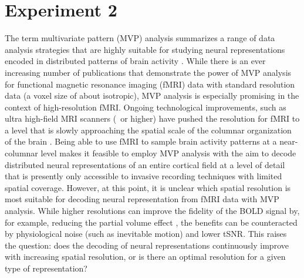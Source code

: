 
\chapter{Experiment 2}
The term multivariate pattern (MVP) analysis summarizes a range of data
analysis strategies that are highly suitable for studying neural
representations encoded in distributed patterns of brain activity
\citep{haxby_2012}. While there is an ever increasing number of publications
that demonstrate the power of MVP analysis for functional magnetic resonance
imaging (fMRI) data \citep{opdebeeck_2010,freeman_2011,alink_2013,freeman_2013}
with standard resolution data (a voxel size of about  isotropic), MVP
analysis is especially promising in the context of high-resolution fMRI.
Ongoing technological improvements, such as ultra high-field MRI scanners
(\sevenT\ or higher) have pushed the resolution for fMRI to a level
that is slowly approaching the spatial scale of the columnar organization of
the brain \citep{yacoub_2008,heidemann_2012}. Being able to use fMRI to sample
brain activity patterns at a near-columnar level makes it feasible to employ
MVP analysis with the aim to decode distributed neural representations of an
entire cortical field at a level of detail that is presently only accessible to
invasive recording techniques with limited spatial coverage. However, at this
point, it is unclear which spatial resolution is most suitable for decoding
neural representation from fMRI data with MVP analysis. While higher
resolutions can improve the fidelity of the BOLD signal by, for example,
reducing the partial volume effect \citep{Weibull_2008}, the benefits can be
counteracted by physiological noise (such as inevitable motion) and lower tSNR. 
This raises the question: does the decoding of neural representations continuously improve
with increasing spatial resolution, or is there an optimal resolution for a
given type of representation?

